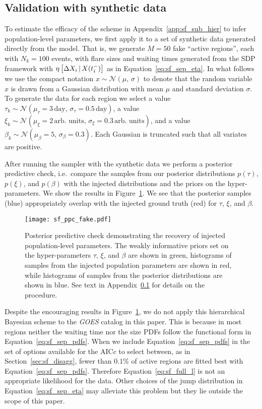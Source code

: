 \begin{subappendices}
\subsection{Validation with synthetic data} \label{app:sf_fake}
To estimate the efficacy of the scheme in Appendix~\ref{app:sf_sub_hier} to infer population-level parameters, we first apply it to a set of synthetic data generated directly from the model. That is, we generate $M=50$ fake ``active regions'', each with $N_k = 100$ events, with flare sizes and waiting times generated from the SDP framework with $\eta\left[\Delta X_{i}\,|\,X(t_i^-)\right]$ as in Equation~\eqref{eq:sf_sep_eta}. In what follows we use the compact notation $x \sim \mathcal{N}(\mu,\, \sigma)$ to denote that the random variable $x$ is drawn from a Gaussian distribution with mean $\mu$ and standard deviation $\sigma$. To generate the data for each region we select a value $\tau_k \sim \mathcal{N}(\mu_\tau = 3\,\textrm{day},\, \sigma_\tau = 0.5\,\textrm{day})$, a value $\xi_k \sim \mathcal{N}(\mu_\xi = 2\,\textrm{arb. units},\, \sigma_\xi = 0.3\,\textrm{arb. units})$, and a value $\beta_k \sim \mathcal{N}(\mu_\beta = 5,\, \sigma_\beta = 0.3)$. Each Gaussian is truncated such that all variates are positive. 

After running the sampler with the synthetic data we perform a posterior predictive check, i.e.~compare the samples from our posterior distributions $p(\tau)$, $p(\xi)$, and $p(\beta)$ with the injected distributions and the priors on the hyper-parameters. We show the results in Figure~\ref{fig:sf_ppc_fake}. We see that the posterior samples (blue) appropriately overlap with the injected ground truth (red) for $\tau$, $\xi$, and $\beta$.  

\begin{figure}
\centering
\texttt{[image: sf\_ppc\_fake.pdf]}
\caption{Posterior predictive check demonstrating the recovery of injected population-level parameters. The weakly informative priors set on the hyper-parameters $\tau$, $\xi$, and $\beta$ are shown in green, histograms of samples from the injected population parameters are shown in red, while histograms of samples from the posterior distributions are shown in blue. See text in Appendix~\ref{app:sf_fake} for details on the procedure.}
\label{fig:sf_ppc_fake}
\end{figure}

Despite the encouraging results in Figure~\ref{fig:sf_ppc_fake}, we do not apply this hierarchical Bayesian scheme to the \emph{GOES} catalog in this paper. This is because in most regions neither the waiting time nor the size PDFs follow the functional form in Equation~\eqref{eq:sf_sep_pdfs}. When we include Equation~\eqref{eq:sf_sep_pdfs} in the set of options available for the AICc to select between, as in Section~\ref{sec:sf_disagg}, fewer than $0.1\%$ of active regions are fitted best with Equation~\eqref{eq:sf_sep_pdfs}. Therefore Equation~\eqref{eq:sf_full_l} is not an appropriate likelihood for the data. Other choices of the jump distribution in Equation~\eqref{eq:sf_sep_eta} may alleviate this problem but they lie outside the scope of this paper.


\end{subappendices}
